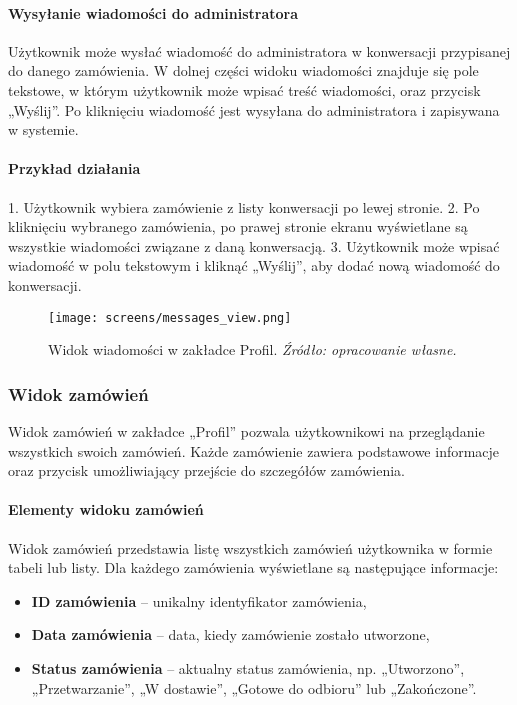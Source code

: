 \documentclass[12pt,a4paper,oneside]{article}
\theoremstyle{definition}
\numberwithin{equation}{section}
\begin{document}
\paragraph{Wysyłanie wiadomości do administratora}
Użytkownik może wysłać wiadomość do administratora w konwersacji przypisanej do danego zamówienia. W dolnej części widoku wiadomości znajduje się pole tekstowe, w którym użytkownik może wpisać treść wiadomości, oraz przycisk „Wyślij”. Po kliknięciu wiadomość jest wysyłana do administratora i zapisywana w systemie.

\paragraph{Przykład działania}
1. Użytkownik wybiera zamówienie z listy konwersacji po lewej stronie.
2. Po kliknięciu wybranego zamówienia, po prawej stronie ekranu wyświetlane są wszystkie wiadomości związane z daną konwersacją.
3. Użytkownik może wpisać wiadomość w polu tekstowym i kliknąć „Wyślij”, aby dodać nową wiadomość do konwersacji.

\begin{figure}[H]
    \centering
    \texttt{[image: screens/messages\_view.png]}
    \caption{Widok wiadomości w zakładce Profil. \emph{Źródło: opracowanie własne.}}
    \label{fig:messages_view}
\end{figure}



\subsubsection{Widok zamówień}
Widok zamówień w zakładce „Profil” pozwala użytkownikowi na przeglądanie wszystkich swoich zamówień. Każde zamówienie zawiera podstawowe informacje oraz przycisk umożliwiający przejście do szczegółów zamówienia.

\paragraph{Elementy widoku zamówień}
Widok zamówień przedstawia listę wszystkich zamówień użytkownika w formie tabeli lub listy. Dla każdego zamówienia wyświetlane są następujące informacje:
\begin{itemize}
    \item \textbf{ID zamówienia} – unikalny identyfikator zamówienia,
    \item \textbf{Data zamówienia} – data, kiedy zamówienie zostało utworzone,
    \item \textbf{Status zamówienia} – aktualny status zamówienia, np. „Utworzono”, „Przetwarzanie”, „W dostawie”, „Gotowe do odbioru” lub „Zakończone”.
\end{itemize}
\end{document}
